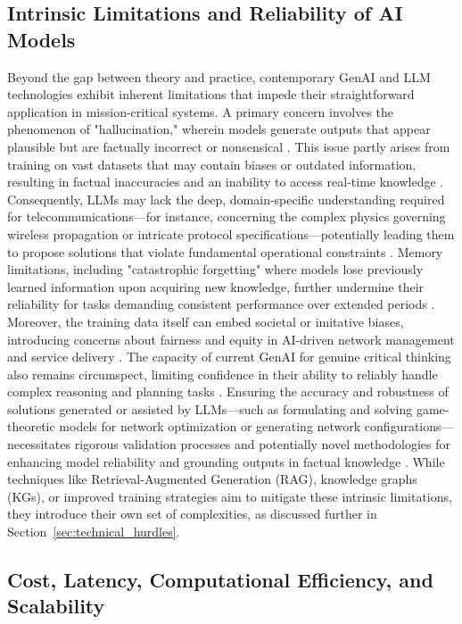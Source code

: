 \documentclass[sigconf]{acmart}
\begin{document}
\subsection{Intrinsic Limitations and Reliability of AI Models}
\label{sec:intrinsic_limitations}

Beyond the gap between theory and practice, contemporary GenAI and LLM technologies exhibit inherent limitations that impede their straightforward application in mission-critical systems. A primary concern involves the phenomenon of "hallucination," wherein models generate outputs that appear plausible but are factually incorrect or nonsensical \cite{ref8, ref17}. This issue partly arises from training on vast datasets that may contain biases or outdated information, resulting in factual inaccuracies and an inability to access real-time knowledge \cite{ref8, ref17}. Consequently, LLMs may lack the deep, domain-specific understanding required for telecommunications—for instance, concerning the complex physics governing wireless propagation or intricate protocol specifications—potentially leading them to propose solutions that violate fundamental operational constraints \cite{ref17}. Memory limitations, including "catastrophic forgetting" where models lose previously learned information upon acquiring new knowledge, further undermine their reliability for tasks demanding consistent performance over extended periods \cite{ref8}. Moreover, the training data itself can embed societal or imitative biases, introducing concerns about fairness and equity in AI-driven network management and service delivery \cite{ref8}. The capacity of current GenAI for genuine critical thinking also remains circumspect, limiting confidence in their ability to reliably handle complex reasoning and planning tasks \cite{ref6}. Ensuring the accuracy and robustness of solutions generated or assisted by LLMs—such as formulating and solving game-theoretic models for network optimization \cite{ref21} or generating network configurations—necessitates rigorous validation processes and potentially novel methodologies for enhancing model reliability and grounding outputs in factual knowledge \cite{ref17}. While techniques like Retrieval-Augmented Generation (RAG), knowledge graphs (KGs), or improved training strategies aim to mitigate these intrinsic limitations, they introduce their own set of complexities, as discussed further in Section~\ref{sec:technical_hurdles}.

\subsection{Cost, Latency, Computational Efficiency, and Scalability}
\label{sec:cost_latency_efficiency}
\end{document}
